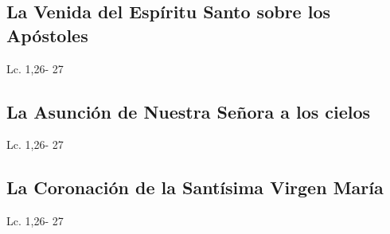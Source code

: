\documentclass[a4paper,11pt]{article}
\begin{document}
    \subsection*{\hfil La Venida del Espíritu Santo sobre los Apóstoles \hfil}
      \begin{multicols}{2}

      \columnbreak
                           
      \end{multicols}         
      \begin{flushright}
        Lc. 1,26- 27           
      \end{flushright}
    \subsection*{\hfil La Asunción de Nuestra Señora a los cielos \hfil}
      \begin{multicols}{2}

      \columnbreak
                           
      \end{multicols}         
      \begin{flushright}
        Lc. 1,26- 27           
      \end{flushright}
    \subsection*{\hfil La Coronación de la Santísima Virgen María \hfil}
      \begin{multicols}{2}

      \columnbreak
                           
      \end{multicols}         
      \begin{flushright}
        Lc. 1,26- 27           
      \end{flushright}
\end{document}
